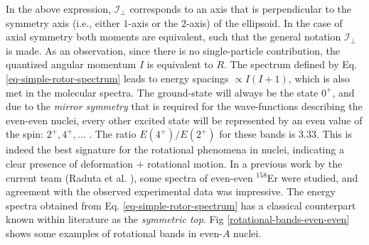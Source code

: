 In the above expression, $\mathcal{I}_\perp$ corresponds to an axis that is perpendicular to the symmetry axis (i.e., either $1$-axis or the $2$-axis) of the ellipsoid. In the case of axial symmetry both moments are equivalent, such that the general notation $\mathcal{I}_\perp$ is made. As an observation, since there is no single-particle contribution, the quantized angular momentum $I$ is equivalent to $R$. The spectrum defined by Eq. \eqref{eq-simple-rotor-spectrum} leads to energy spacings $\propto I(I+1)$, which is also met in the molecular spectra. The ground-state will always be the state $0^+$, and due to the \emph{mirror symmetry} that is required for the wave-functions describing the even-even nuclei, every other excited state will be represented by an even value of the spin: $2^+,4^+,\dots$ \cite{ring2004nuclear}. The ratio $E(4^+)/E(2^+)$ for these bands is $3.33$. This is indeed the best signature for the rotational phenomena in nuclei, indicating a clear presence of deformation + rotational motion. In a previous work by the current team (Raduta et al. \cite{raduta2017semiclassical}), some spectra of even-even $^{158}$Er were studied, and agreement with the observed experimental data was impressive. The energy spectra obtained from Eq. \eqref{eq-simple-rotor-spectrum} has a classical counterpart known within literature as the \emph{symmetric top}. Fig \ref{rotational-bands-even-even} shows some examples of rotational bands in even-$A$ nuclei.
